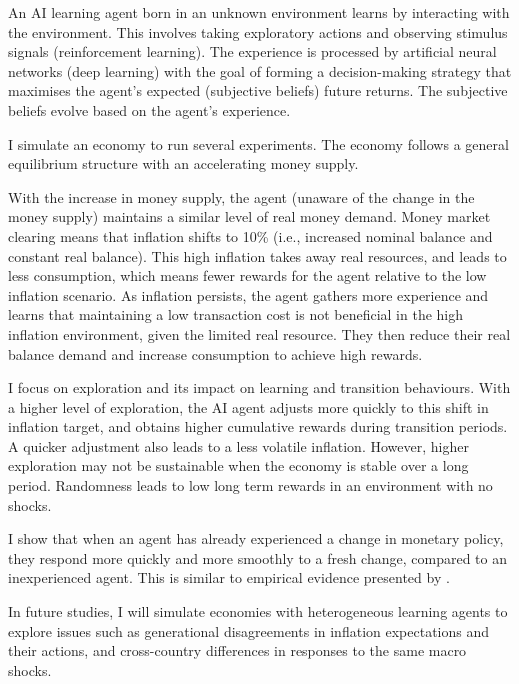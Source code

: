 \documentclass[hidelinks]{article}
\begin{document}
An AI learning agent born in an unknown environment learns by interacting with the environment. This involves taking exploratory actions and observing stimulus signals (reinforcement learning). The experience is processed by artificial neural networks (deep learning) with the goal of forming a decision-making strategy that maximises the agent's expected (subjective beliefs) future returns. The subjective beliefs evolve based on the agent's experience. 
 
 I simulate an economy to run several experiments. The economy follows a general equilibrium structure with an accelerating money supply. 
 
 With the increase in money supply, the agent (unaware of the change in the money supply) maintains a similar level of real money demand. Money market clearing means that inflation shifts to 10\% (i.e., increased nominal balance and constant real balance). This high inflation takes away real resources, and leads to less consumption, which means fewer rewards for the agent relative to the low inflation scenario. As inflation persists, the agent gathers more experience and learns that maintaining a low transaction cost is not beneficial in the high inflation environment, given the limited real resource. They then reduce their real balance demand and increase consumption to achieve high rewards.
 
 I focus on exploration and its impact on learning and transition behaviours. With a higher level of exploration, the AI agent adjusts more quickly to this shift in inflation target, and obtains higher cumulative rewards during transition periods. A quicker adjustment also leads to a less volatile inflation. However, higher exploration may not be sustainable when the economy is stable over a long period. Randomness leads to low long term rewards in an environment with no shocks. 
 
I show that when an agent has already experienced a change in monetary policy, they respond more quickly and more smoothly to a fresh change, compared to an inexperienced agent. This is similar to empirical evidence presented by \cite{Cavalloetal2017}.
 
  
 In future studies, I will simulate economies with heterogeneous learning agents to explore issues such as generational disagreements in inflation expectations and their actions, and cross-country differences in responses to the same macro shocks.
 
\end{document}
